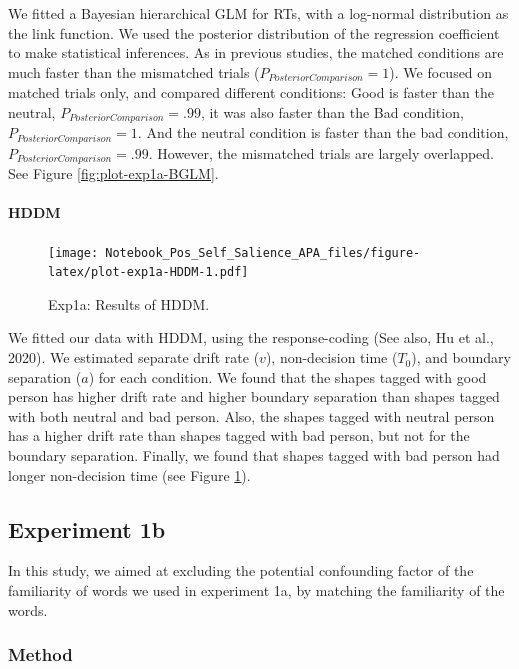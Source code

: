 \documentclass[
  english,
  man]{apa6}
\let\oldparagraph\paragraph
\renewcommand{\paragraph}[1]{\oldparagraph{#1}\mbox{}}
\begin{document}
We fitted a Bayesian hierarchical GLM for RTs, with a log-normal distribution as the link function. We used the posterior distribution of the regression coefficient to make statistical inferences. As in previous studies, the matched conditions are much faster than the mismatched trials (\(P_{PosteriorComparison} = 1\)). We focused on matched trials only, and compared different conditions: Good is faster than the neutral, \(P_{PosteriorComparison} = .99\), it was also faster than the Bad condition, \(P_{PosteriorComparison} = 1\). And the neutral condition is faster than the bad condition, \(P_{PosteriorComparison} = .99\). However, the mismatched trials are largely overlapped. See Figure \ref{fig:plot-exp1a-BGLM}.

\hypertarget{hddm}{%
\paragraph{HDDM}\label{hddm}}

\begin{figure}
\centering
\texttt{[image: Notebook\_Pos\_Self\_Salience\_APA\_files/figure-latex/plot-exp1a-HDDM-1.pdf]}
\caption{\label{fig:plot-exp1a-HDDM}Exp1a: Results of HDDM.}
\end{figure}

We fitted our data with HDDM, using the response-coding (See also, Hu et al., 2020). We estimated separate drift rate (\(v\)), non-decision time (\(T_{0}\)), and boundary separation (\(a\)) for each condition. We found that the shapes tagged with good person has higher drift rate and higher boundary separation than shapes tagged with both neutral and bad person. Also, the shapes tagged with neutral person has a higher drift rate than shapes tagged with bad person, but not for the boundary separation. Finally, we found that shapes tagged with bad person had longer non-decision time (see Figure \ref{fig:plot-exp1a-HDDM}).

\hypertarget{experiment-1b}{%
\subsection{Experiment 1b}\label{experiment-1b}}

In this study, we aimed at excluding the potential confounding factor of the familiarity of words we used in experiment 1a, by matching the familiarity of the words.

\hypertarget{method}{%
\subsubsection{Method}\label{method}}
\end{document}
